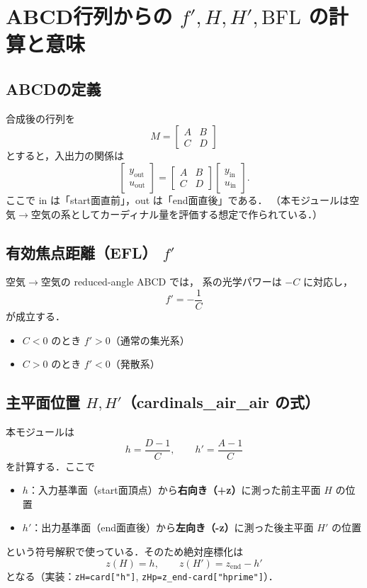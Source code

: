 \documentclass[a4paper,11pt]{jsarticle} %
\begin{document}
\section{ABCD行列からの $f',H,H',\mathrm{BFL}$ の計算と意味}

\subsection{ABCDの定義}
合成後の行列を
\[
M=
\begin{bmatrix}
A & B\\
C & D
\end{bmatrix}
\]
とすると，入出力の関係は
\[
\begin{bmatrix}
y_{\text{out}}\\ u_{\text{out}}
\end{bmatrix}
=
\begin{bmatrix}
A & B\\
C & D
\end{bmatrix}
\begin{bmatrix}
y_{\text{in}}\\ u_{\text{in}}
\end{bmatrix}.
\]
ここで in は「start面直前」，out は「end面直後」である．
（本モジュールは空気$\rightarrow$空気の系としてカーディナル量を評価する想定で作られている．）

\subsection{有効焦点距離（EFL） $f'$}
空気$\rightarrow$空気の reduced-angle ABCD では，
系の光学パワーは $-C$ に対応し，
\[
f' = -\frac{1}{C}
\]
が成立する．
\begin{itemize}
  \item $C<0$ のとき $f'>0$（通常の集光系）
  \item $C>0$ のとき $f'<0$（発散系）
\end{itemize}

\subsection{主平面位置 $H, H'$（cardinals\_air\_air の式）}
本モジュールは
\[
h = \frac{D-1}{C},\qquad
h' = \frac{A-1}{C}
\]
を計算する．ここで
\begin{itemize}
  \item $h$：入力基準面（start面頂点）から\textbf{右向き（+z）}に測った前主平面 $H$ の位置
  \item $h'$：出力基準面（end面直後）から\textbf{左向き（-z）}に測った後主平面 $H'$ の位置
\end{itemize}
という符号解釈で使っている．そのため絶対座標化は
\[
z(H)=h,
\qquad
z(H')=z_{\text{end}}-h'
\]
となる（実装：\texttt{zH=card["h"]}, \texttt{zHp=z\_end-card["hprime"]}）．
\end{document}
